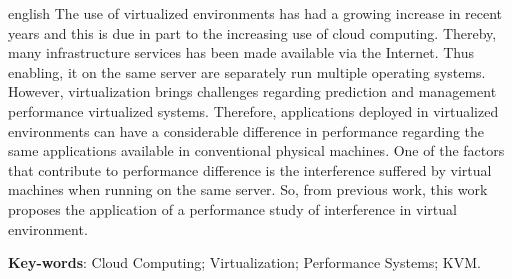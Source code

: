 \begin{resumo}[Abstract]
 \begin{otherlanguage*}{english}
The use of virtualized environments has had a growing increase in recent years and this is due in part to the increasing use of cloud computing. Thereby, many infrastructure services has been made available via the Internet. Thus enabling, it on the same server are separately run multiple operating systems. However, virtualization brings challenges regarding prediction and management performance virtualized systems. Therefore, applications deployed in virtualized environments can have a considerable difference in performance regarding the same applications available in conventional physical machines. One of the factors that contribute to performance difference is the interference suffered by virtual machines when running on the same server. So, from previous work, this work proposes the application of a performance study of interference in virtual environment. %







   \vspace{\onelineskip}
 
   \noindent 
   \textbf{Key-words}: Cloud Computing; Virtualization; Performance Systems; KVM.
 \end{otherlanguage*}
\end{resumo}
